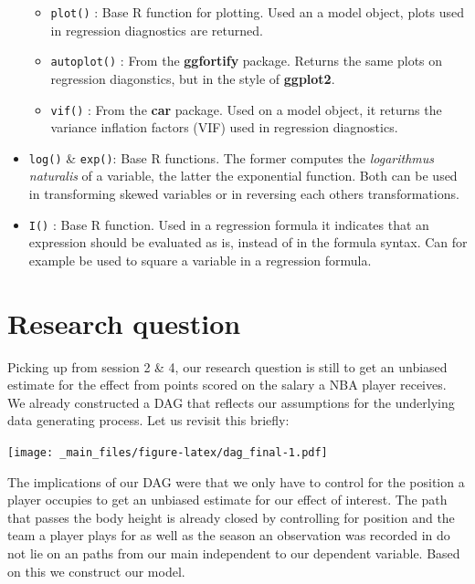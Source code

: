 \documentclass[
]{book}
\providecommand{\tightlist}{%
  \setlength{\itemsep}{0pt}\setlength{\parskip}{0pt}}
\begin{document}
\begin{itemize}
  \begin{itemize}
  \tightlist
  \item
    \texttt{plot()} : Base R function for plotting. Used an a model object,
    plots used in regression diagnostics are returned.
  \item
    \texttt{autoplot()} : From the \textbf{ggfortify} package. Returns the same
    plots on regression diagonstics, but in the style of
    \textbf{ggplot2}.
  \item
    \texttt{vif()} : From the \textbf{car} package. Used on a model object, it
    returns the variance inflation factors (VIF) used in regression
    diagnostics.
  \end{itemize}
\item
  \texttt{log()} \& \texttt{exp()}: Base R functions. The former computes the
  \emph{logarithmus naturalis} of a variable, the latter the exponential
  function. Both can be used in transforming skewed variables or in
  reversing each others transformations.
\item
  \texttt{I()} : Base R function. Used in a regression formula it indicates
  that an expression should be evaluated as is, instead of in the
  formula syntax. Can for example be used to square a variable in a
  regression formula.
\end{itemize}

\hypertarget{research-question}{%
\section{Research question}\label{research-question}}

Picking up from session 2 \& 4, our research question is still to get an
unbiased estimate for the effect from points scored on the salary a NBA
player receives. We already constructed a DAG that reflects our
assumptions for the underlying data generating process. Let us revisit
this briefly:

\texttt{[image: \_main\_files/figure-latex/dag\_final-1.pdf]}

The implications of our DAG were that we only have to control for the
position a player occupies to get an unbiased estimate for our effect of
interest. The path that passes the body height is already closed by
controlling for position and the team a player plays for as well as the
season an observation was recorded in do not lie on an paths from our
main independent to our dependent variable. Based on this we construct
our model.
\end{document}
